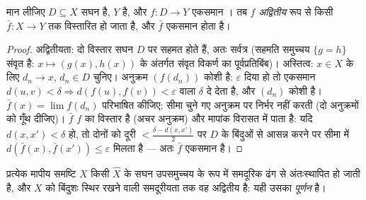 \begin{theorem}[एकसमान संतत प्रतिचित्रणों का विस्तार]
\label{thm:b3:complete:extension}
मान लीजिए $D \subseteq X$ सघन है, $Y$  है, और $f \colon D \to
Y$ एकसमान । तब
$f$ \emph{अद्वितीय} रूप से किसी  $\bar f \colon X \to Y$ तक विस्तारित हो जाता
है, और $\bar f$ एकसमान  होता है।
\end{theorem}

\begin{proof}
अद्वितीयता: दो  विस्तार सघन $D$ पर सहमत होते हैं, अतः सर्वत्र
(सहमति समुच्चय $\{g = h\}$ संवृत है: $x\mapsto(g(x), h(x))$ के अंतर्गत संवृत विकर्ण का
पूर्वप्रतिबिंब)। अस्तित्व: $x \in X$ के लिए $d_n \to x$, $d_n \in D$ चुनिए।
अनुक्रम $(f(d_n))$ कोशी है: $\varepsilon$ दिया हो तो एकसमान  $d(u,v) < \delta \Rightarrow
d(f(u), f(v)) < \varepsilon$ वाला
$\delta$ दे देता है, और $(d_n)$ कोशी है। $\bar f(x) = \lim f(d_n)$ परिभाषित कीजिए; सीमा चुने
गए अनुक्रम पर निर्भर नहीं करती (दो अनुक्रमों को गूँथ दीजिए)।
$\bar f$ $f$ का विस्तार है (अचर अनुक्रम) और  मापांक विरासत में
पाता है: यदि $d(x, x') < \delta$ हो, तो दोनों को दूरी $< \frac{\delta - d(x,x')}2$ पर $D$ के बिंदुओं से
आसन्न करने पर सीमा में $d(\bar f(x), \bar
f(x')) \leq \varepsilon$ मिलता है --- अतः $\bar f$ एकसमान  है।
\end{proof}

\begin{theorem}[पूर्णन]\label{thm:b3:complete:completion}
प्रत्येक मापीय समष्टि $X$ किसी  $\hat X$ के सघन
उपसमुच्चय के रूप में समदूरिक ढंग से अंतःस्थापित हो जाती है, और
$X$ को बिंदुशः स्थिर रखने वाली समदूरीयता तक वह अद्वितीय है:
यही उसका \emph{पूर्णन} है।
\end{theorem}

